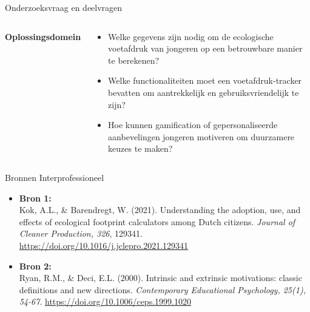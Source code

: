 \documentclass[aspectratio=169]{beamer}
\begin{document}
\begin{frame}[t]{Onderzoeksvraag en deelvragen}
\begin{columns}[t,onlytextwidth]
        \begin{tcolorbox}[columntitle]
            \textbf{Oplossingsdomein}
        \end{tcolorbox}
        \begin{tcolorbox}[columntext, left=0mm]
            \begin{itemize}[leftmargin=*]
                \item[] \scriptsize Welke gegevens zijn nodig om de ecologische voetafdruk van jongeren op een betrouwbare manier te berekenen?
                \item[] \scriptsize Welke functionaliteiten moet een voetafdruk-tracker bevatten om aantrekkelijk en gebruiksvriendelijk te zijn?
                \item[] \scriptsize Hoe kunnen gamification of gepersonaliseerde aanbevelingen jongeren motiveren om duurzamere keuzes te maken?
            \end{itemize}
        \end{tcolorbox}
    \end{columns}
\end{frame}

\begin{frame}{Bronnen Interprofessioneel}
    
    \vspace{-5pt}
    
    \begin{tcolorbox}[colback=colortwo, colframe=colorsix, width=.8\textwidth]
        \begin{itemize}[label=\textcolor{colorsix}{$\blacktriangleright$}]
            \item \textbf{\textcolor{colorsix}{Bron 1:}} \\ Kok, A.L., \& Barendregt, W. (2021). Understanding the adoption, use, and effects of ecological footprint calculators among Dutch citizens. \textit{Journal of Cleaner Production, 326}, 129341. \href{https://doi.org/10.1016/j.jclepro.2021.129341}{\textcolor{linkblue}{https://doi.org/10.1016/j.jclepro.2021.129341}}
            \item \textbf{\textcolor{colorsix}{Bron 2:}} \\ Ryan, R.M., \& Deci, E.L. (2000). Intrinsic and extrinsic motivations: classic definitions and new directions. \textit{Contemporary Educational Psychology, 25(1), 54-67}. \href{https://doi.org/10.1006/ceps.1999.1020}{\textcolor{linkblue}{https://doi.org/10.1006/ceps.1999.1020}}
        \end{itemize}
    \end{tcolorbox}
\end{frame}
\end{document}
